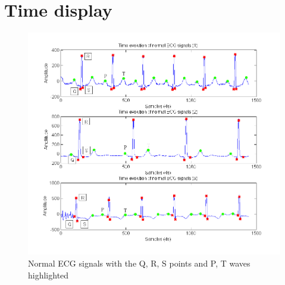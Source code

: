 \documentclass[11pt]{report}
\begin{document}
	\section{Time display}
		\begin{figure}[ht]
			\centering
			\includegraphics[scale=0.65]{images/Q311_1.png}
			\caption{Normal ECG signals with the Q, R, S points and P, T waves highlighted}
			\label{Q311_1}
		\end{figure}
\end{document}
